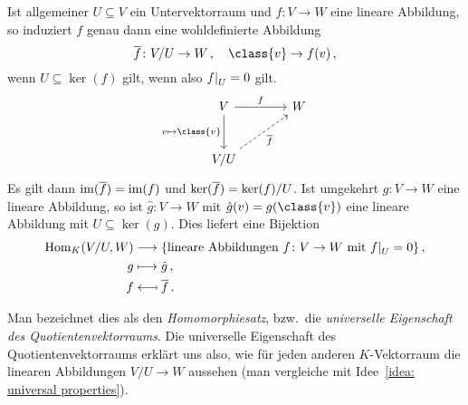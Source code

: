 \begin{remark}
  Ist allgemeiner $U \subseteq V$ ein Untervektorraum und $f \colon V \to W$ eine lineare Abbildung, so induziert $f$ genau dann eine wohldefinierte Abbildung
  \[
            \induced{f}
    \colon  V\!/U
    \to     W \,,
    \quad   \class{v}
    \to     f(v) \,,
  \]
  wenn $U \subseteq \ker(f)$ gilt, wenn also $\restrict{f}{U} = 0$ gilt.
  \[
    \begin{tikzcd}[sep = large]
        V
        \arrow{r}[above]{f}
        \arrow{d}[left]{v \mapsto \class{v}}
      & W
      \\
        V\!/U
        \arrow[dashed]{ru}[below right]{\induced{f}}
      & {}
    \end{tikzcd}
  \]
  Es gilt dann $\operatorname{im}(\overline{f}) = \operatorname{im}(f)$ und $\ker(\overline{f}) = \ker(f)/U$.
  Ist umgekehrt $g \colon V \to W$ eine lineare Abbildung, so ist $\hat{g} \colon V \to W$ mit $\hat{g}(v) = g(\class{v})$ eine lineare Abbildung mit $U \subseteq \ker(g)$.
  Dies liefert eine Bijektion
  \begin{align*}
                      \Hom_K(V/U,W)
    &\longrightarrow  \{ \text{lineare Abbildungen $f \colon V \to W$ mit $\restrict{f}{U}= 0$} \} \,,
    \\
                      g
    &\longmapsto      \hat{g} \,,
    \\
                      f
    &\longmapsfrom    \induced{f} \,.
  \end{align*}

  Man bezeichnet dies als den \emph{Homomorphiesatz}, bzw.\ die \emph{universelle Eigenschaft des Quotientenvektorraums}.
  Die universelle Eigenschaft des Quotientenvektorraums erklärt uns also, wie für jeden anderen $K$-Vektorraum die linearen Abbildungen $V\!/U \to W$ aussehen (man vergleiche mit Idee~\ref{idea: universal properties}).
\end{remark}

